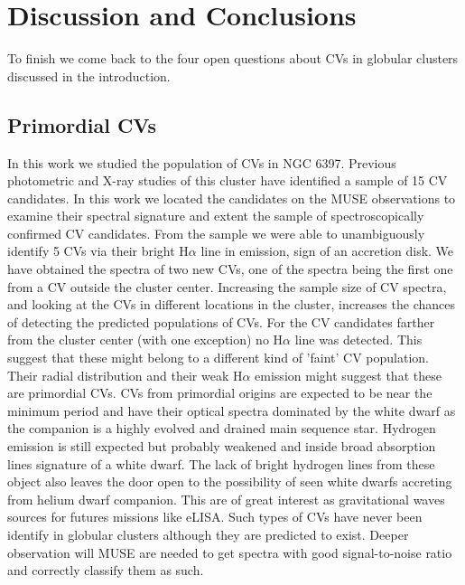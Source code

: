 \chapter{Discussion and Conclusions}\label{chap:conclu}
\thispagestyle{fancy}

To finish we come back to the four open questions about CVs in globular clusters discussed in the introduction. 


\section{Primordial CVs}

In this work we studied the population of CVs in NGC 6397. Previous photometric and X-ray studies of this cluster have identified a sample of 15 CV candidates. In this work we located the candidates on the MUSE observations to examine their spectral signature and extent the sample of spectroscopically confirmed CV candidates. From the sample we were able to unambiguously identify 5 CVs via their bright H$\alpha$ line in emission, sign of an accretion disk. We have obtained the spectra of two new CVs, one of the spectra being the first one from a CV outside the cluster center. Increasing the sample size of CV spectra, and looking at the CVs in different locations in the cluster, increases the chances of detecting the predicted populations of CVs. For the CV candidates farther from the cluster center (with one exception) no H$\alpha$ line was detected. This suggest that these might belong to a different kind of 'faint' CV population. Their radial distribution and their weak H$\alpha$ emission might suggest that these are primordial CVs. CVs from primordial origins are expected to be near the minimum period and have their optical spectra dominated by the white dwarf as the companion is a highly evolved and drained main sequence star. Hydrogen emission is still expected but probably weakened and inside broad absorption lines signature of a white dwarf. The lack of bright hydrogen lines from these object also leaves the door open to the possibility of seen white dwarfs accreting from helium dwarf companion. This are of great interest as gravitational waves sources for futures missions like eLISA. Such types of CVs have never been identify in globular clusters although they are predicted to exist. Deeper observation will MUSE are needed to get spectra with good signal-to-noise ratio and correctly classify them as such. 

